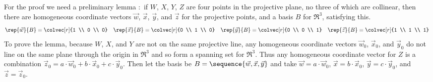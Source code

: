 For the proof we need a preliminary lemma \cite{Coxeter}:~if 
$W$, $X$, $Y$, $Z$ are four points in the projective plane, 
no three of which are collinear,
then there are homogeneous coordinate
vectors $\vec{w}$, $\vec{x}$, $\vec{y}$, and $\vec{z}$
for the projective points, and a basis $B$ for $\Re^3$, 
satisfying this. 
\begin{equation*}
  \rep{\vec{w}}{B}=\colvec[r]{1 \\ 0 \\ 0}
  \quad
  \rep{\vec{x}}{B}=\colvec[r]{0 \\ 1 \\ 0}
  \quad
  \rep{\vec{y}}{B}=\colvec[r]{0 \\ 0 \\ 1}
  \quad
  \rep{\vec{z}}{B}=\colvec[r]{1 \\ 1 \\ 1}
\end{equation*}
To prove the lemma, 
because $W$, $X$, and $Y$ are not on the same projective line, any
homogeneous coordinate vectors 
$\vec{w}_0$, $\vec{x}_0$, and $\vec{y}_0$ do not line on the same
plane through the origin in $\Re^3$ and so form a 
spanning set for $\Re^3$.
Thus any homogeneous coordinate vector for $Z$ is a combination 
$\vec{z}_0=a\cdot\vec{w}_0+b\cdot\vec{x}_0+c\cdot\vec{y}_0$.
Then let the basis be $B=\sequence{\vec{w},\vec{x},\vec{y}}$ and take 
$\vec{w}=a\cdot\vec{w}_0$,
$\vec{x}=b\cdot\vec{x}_0$,
$\vec{y}=c\cdot\vec{y}_0$,
and $\vec{z}=\vec{z}_0$.  

